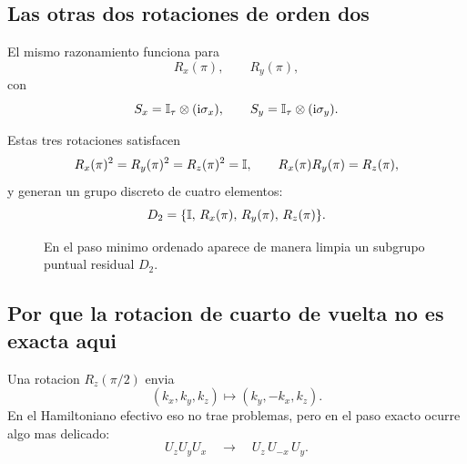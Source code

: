 \subsection{Las otras dos rotaciones de orden dos}
El mismo razonamiento funciona para
\begin{equation}
R_x(\pi),\qquad R_y(\pi),
\end{equation}
con
\begin{equation}
S_x=\mathbb{I}_{\tau}\otimes(\mathrm{i}\sigma_x),
\qquad
S_y=\mathbb{I}_{\tau}\otimes(\mathrm{i}\sigma_y).
\end{equation}

Estas tres rotaciones satisfacen
\begin{equation}
R_x(\pi)^2=R_y(\pi)^2=R_z(\pi)^2=\mathbb{I},
\qquad
R_x(\pi)R_y(\pi)=R_z(\pi),
\end{equation}
y generan un grupo discreto de cuatro elementos:
\begin{equation}
D_2=\{\mathbb{I},\,R_x(\pi),\,R_y(\pi),\,R_z(\pi)\}.
\label{c25:eq:D2}
\end{equation}

\begin{figure}[h!]
\centering
{}
\caption{En el paso minimo ordenado aparece de manera limpia un subgrupo puntual residual \(D_2\).}
\end{figure}

\subsection{Por que la rotacion de cuarto de vuelta no es exacta aqui}
Una rotacion \(R_z(\pi/2)\) envia
\begin{equation}
(k_x,k_y,k_z)\mapsto(k_y,-k_x,k_z).
\end{equation}
En el Hamiltoniano efectivo eso no trae problemas, pero en el paso exacto ocurre algo mas delicado:
\[
U_zU_yU_x
\quad\longrightarrow\quad
U_z\,U_{-x}\,U_y.
\]

